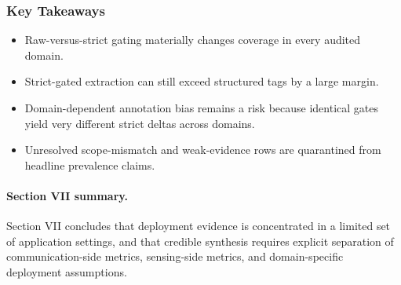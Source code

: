\subsubsection{Key Takeaways}
\begin{itemize}
\item Raw-versus-strict gating materially changes coverage in every audited domain.
\item Strict-gated extraction can still exceed structured tags by a large margin.
\item Domain-dependent annotation bias remains a risk because identical gates yield very different strict deltas across domains.
\item Unresolved scope-mismatch and weak-evidence rows are quarantined from headline prevalence claims.
\end{itemize}

\paragraph{Section VII summary.}
Section VII concludes that deployment evidence is concentrated in a limited set of application settings, and that credible synthesis requires explicit separation of communication-side metrics, sensing-side metrics, and domain-specific deployment assumptions.
